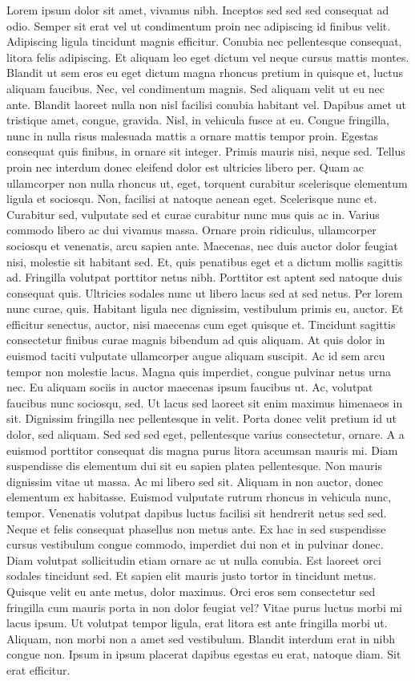\documentclass[
  12pt,
]{article}
\begin{document}
Lorem ipsum dolor sit amet, vivamus nibh. Inceptos sed sed sed consequat ad odio. Semper sit erat vel ut condimentum proin nec adipiscing id finibus velit. Adipiscing ligula tincidunt magnis efficitur. Conubia nec pellentesque consequat, litora felis adipiscing. Et aliquam leo eget dictum vel neque cursus mattis montes. Blandit ut sem eros eu eget dictum magna rhoncus pretium in quisque et, luctus aliquam faucibus. Nec, vel condimentum magnis. Sed aliquam velit ut eu nec ante. Blandit laoreet nulla non nisl facilisi conubia habitant vel. Dapibus amet ut tristique amet, congue, gravida. Nisl, in vehicula fusce at eu. Congue fringilla, nunc in nulla risus malesuada mattis a ornare mattis tempor proin. Egestas consequat quis finibus, in ornare sit integer. Primis mauris nisi, neque sed. Tellus proin nec interdum donec eleifend dolor est ultricies libero per. Quam ac ullamcorper non nulla rhoncus ut, eget, torquent curabitur scelerisque elementum ligula et sociosqu. Non, facilisi at natoque aenean eget. Scelerisque nunc et. Curabitur sed, vulputate sed et curae curabitur nunc mus quis ac in. Varius commodo libero ac dui vivamus massa. Ornare proin ridiculus, ullamcorper sociosqu et venenatis, arcu sapien ante. Maecenas, nec duis auctor dolor feugiat nisi, molestie sit habitant sed. Et, quis penatibus eget et a dictum mollis sagittis ad. Fringilla volutpat porttitor netus nibh. Porttitor est aptent sed natoque duis consequat quis. Ultricies sodales nunc ut libero lacus sed at sed netus. Per lorem nunc curae, quis. Habitant ligula nec dignissim, vestibulum primis eu, auctor. Et efficitur senectus, auctor, nisi maecenas cum eget quisque et. Tincidunt sagittis consectetur finibus curae magnis bibendum ad quis aliquam. At quis dolor in euismod taciti vulputate ullamcorper augue aliquam suscipit. Ac id sem arcu tempor non molestie lacus. Magna quis imperdiet, congue pulvinar netus urna nec. Eu aliquam sociis in auctor maecenas ipsum faucibus ut. Ac, volutpat faucibus nunc sociosqu, sed. Ut lacus sed laoreet sit enim maximus himenaeos in sit. Dignissim fringilla nec pellentesque in velit. Porta donec velit pretium id ut dolor, sed aliquam. Sed sed sed eget, pellentesque varius consectetur, ornare. A a euismod porttitor consequat dis magna purus litora accumsan mauris mi. Diam suspendisse dis elementum dui sit eu sapien platea pellentesque. Non mauris dignissim vitae ut massa. Ac mi libero sed sit. Aliquam in non auctor, donec elementum ex habitasse. Euismod vulputate rutrum rhoncus in vehicula nunc, tempor. Venenatis volutpat dapibus luctus facilisi sit hendrerit netus sed sed. Neque et felis consequat phasellus non metus ante. Ex hac in sed suspendisse cursus vestibulum congue commodo, imperdiet dui non et in pulvinar donec. Diam volutpat sollicitudin etiam ornare ac ut nulla conubia. Est laoreet orci sodales tincidunt sed. Et sapien elit mauris justo tortor in tincidunt metus. Quisque velit eu ante metus, dolor maximus. Orci eros sem consectetur sed fringilla cum mauris porta in non dolor feugiat vel? Vitae purus luctus morbi mi lacus ipsum. Ut volutpat tempor ligula, erat litora est ante fringilla morbi ut. Aliquam, non morbi non a amet sed vestibulum. Blandit interdum erat in nibh congue non. Ipsum in ipsum placerat dapibus egestas eu erat, natoque diam. Sit erat efficitur.
\end{document}
